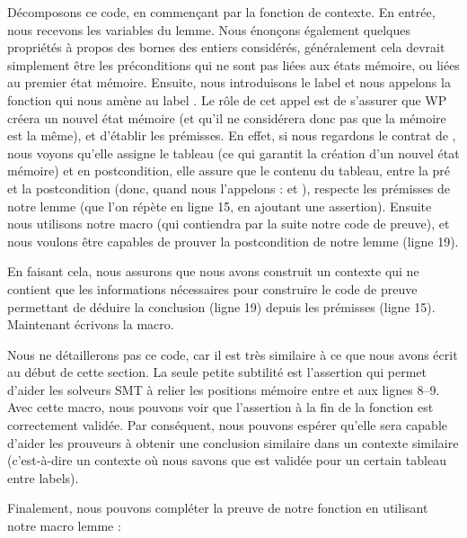 Décomposons ce code, en commençant par la fonction de contexte. En entrée, nous
recevons les variables du lemme. Nous énonçons également quelques propriétés à
propos des bornes des entiers considérés, généralement cela devrait simplement
être les préconditions qui ne sont pas liées aux états mémoire, ou liées au
premier état mémoire. Ensuite, nous introduisons le label  et nous
appelons la fonction  qui nous amène au label
. Le rôle de cet appel est de s'assurer que WP créera un nouvel
état mémoire (et qu'il ne considérera donc pas que la mémoire est la même), et
d'établir les prémisses. En effet, si nous regardons le contrat de
, nous voyons qu'elle assigne le tableau (ce qui
garantit la création d'un nouvel état mémoire) et en postcondition, elle assure
que le contenu du tableau, entre la pré et la postcondition (donc, quand nous
l'appelons :  et ), respecte les prémisses de notre
lemme (que l'on répète en ligne 15, en ajoutant une assertion). Ensuite nous
utilisons notre macro  (qui contiendra par la suite notre
code de preuve), et nous voulons être capables de prouver la postcondition de
notre lemme (ligne 19).


En faisant cela, nous assurons que nous avons construit un contexte qui ne
contient que les informations nécessaires pour construire le code de preuve
permettant de déduire la conclusion (ligne 19) depuis les prémisses (ligne 15).
Maintenant écrivons la macro.




Nous ne détaillerons pas ce code, car il est très similaire à ce que nous avons
écrit au début de cette section. La seule petite subtilité est l'assertion qui
permet d'aider les solveurs SMT à relier les positions mémoire entre
 et  aux lignes 8--9. Avec cette macro, nous
pouvons voir que l'assertion à la fin de la fonction
 est correctement validée. Par
conséquent, nous pouvons espérer qu'elle sera capable d'aider les prouveurs à
obtenir une conclusion similaire dans un contexte similaire (c'est-à-dire un
contexte où nous savons que  est validée pour un certain
tableau entre labels).


Finalement, nous pouvons compléter la preuve de notre fonction 
en utilisant notre macro lemme :




